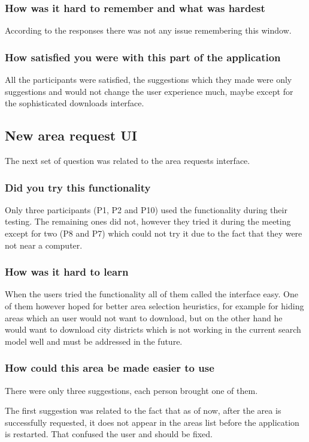 \documentclass[nolof,digital]{fithesis3}
\begin{document}
\subsubsection{How was it hard to remember and what was hardest}
According to the responses there was not any issue remembering this window.
\subsubsection{How satisfied you were with this part of the application}
All the participants were satisfied, the suggestions which they made were only suggestions and would not change the user experience much, maybe except for the sophisticated downloads interface.
\subsection{New area request UI}
The next set of question was related to the area requests interface.
\subsubsection{Did you try this functionality}
Only three participants (P1, P2 and P10) used the functionality during their testing. The remaining ones did not, however they tried it during the meeting except for two (P8 and P7) which could not try it due to the fact that they were not near a computer.
\subsubsection{How was it hard to learn}
When the users tried the functionality all of them called the interface easy. One of them however hoped for better area selection heuristics, for example for hiding areas which an user would not want to download, but on the other hand he would want to download city districts which is not working in the current search model well and must be addressed in the future.
\subsubsection{How could this area be made easier to use}
There were only three suggestions, each person brought one of them.

The first suggestion was related to the fact that as of now, after the area is successfully requested, it does not appear in the areas list before the application is restarted. That confused the user and should be fixed.
\end{document}
